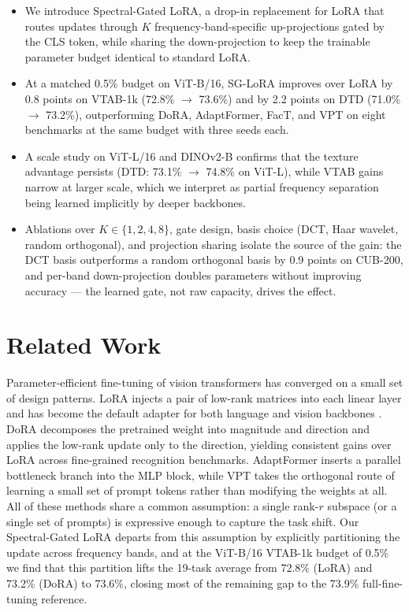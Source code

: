 \documentclass{article}
\begin{document}
\begin{itemize}
    \item We introduce Spectral-Gated LoRA, a drop-in replacement for LoRA that routes updates through $K$ frequency-band-specific up-projections gated by the CLS token, while sharing the down-projection to keep the trainable parameter budget identical to standard LoRA.
    \item At a matched 0.5\% budget on ViT-B/16, SG-LoRA improves over LoRA by 0.8 points on VTAB-1k (72.8\% $\rightarrow$ 73.6\%) and by 2.2 points on DTD (71.0\% $\rightarrow$ 73.2\%), outperforming DoRA, AdaptFormer, FacT, and VPT on eight benchmarks at the same budget with three seeds each.
    \item A scale study on ViT-L/16 and DINOv2-B confirms that the texture advantage persists (DTD: 73.1\% $\rightarrow$ 74.8\% on ViT-L), while VTAB gains narrow at larger scale, which we interpret as partial frequency separation being learned implicitly by deeper backbones.
    \item Ablations over $K \in \{1, 2, 4, 8\}$, gate design, basis choice (DCT, Haar wavelet, random orthogonal), and projection sharing isolate the source of the gain: the DCT basis outperforms a random orthogonal basis by 0.9 points on CUB-200, and per-band down-projection doubles parameters without improving accuracy — the learned gate, not raw capacity, drives the effect.
\end{itemize}

\section{Related Work}
Parameter-efficient fine-tuning of vision transformers has converged on a small set of design patterns. LoRA \citep{hu2022lora} injects a pair of low-rank matrices into each linear layer and has become the default adapter for both language and vision backbones \citep{dosovitskiy2021vit}. DoRA \citep{liu2024dora} decomposes the pretrained weight into magnitude and direction and applies the low-rank update only to the direction, yielding consistent gains over LoRA across fine-grained recognition benchmarks. AdaptFormer \citep{chen2022adaptformer} inserts a parallel bottleneck branch into the MLP block, while VPT \citep{jia2022vpt} takes the orthogonal route of learning a small set of prompt tokens rather than modifying the weights at all. All of these methods share a common assumption: a single rank-$r$ subspace (or a single set of prompts) is expressive enough to capture the task shift. Our Spectral-Gated LoRA departs from this assumption by explicitly partitioning the update across frequency bands, and at the ViT-B/16 VTAB-1k budget of 0.5\% we find that this partition lifts the 19-task average from 72.8\% (LoRA) and 73.2\% (DoRA) to 73.6\%, closing most of the remaining gap to the 73.9\% full-fine-tuning reference.
\end{document}
